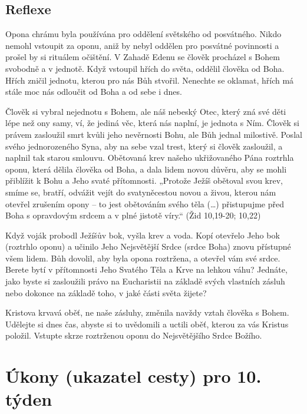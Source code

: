\documentclass[11pt]{article}
\begin{document}
\subsection*{Reflexe}
Opona chrámu byla používána pro oddělení světského od posvátného. Nikdo nemohl vstoupit za oponu, aniž by nebyl
oddělen pro posvátné povinnosti a prošel by si rituálem očištění. V Zahadě Edenu se člověk procházel s Bohem
svobodně a v jednotě. Když vstoupil hřích do světa, oddělil člověka od Boha. Hřích zničil jednotu, kterou pro nás Bůh
stvořil. Nenechte se oklamat, hřích má stále moc nás odloučit od Boha a od sebe i dnes.

Člověk si vybral nejednotu s Bohem, ale náš nebeský Otec, který zná své děti lépe než ony samy, ví, že jediná věc,
která nás naplní, je jednota s Ním. Člověk si právem zasloužil smrt kvůli jeho nevěrnosti Bohu, ale Bůh jednal
milostivě. Poslal svého jednorozeného Syna, aby na sebe vzal trest, který si člověk zasloužil, a naplnil tak starou
smlouvu. Obětovaná krev našeho ukřižovaného Pána roztrhla oponu, která dělila člověka od Boha, a dala lidem novou
důvěru, aby se mohli přiblížit k Bohu a Jeho svaté přítomnosti. „Protože Ježíš obětoval svou krev, smíme se, bratří,
odvážit vejít do svatyněcestou novou a živou, kterou nám otevřel zrušením opony – to jest obětováním svého těla (…)
přistupujme před Boha s opravdovým srdcem a v plné jistotě víry.“ (Žid 10,19-20; 10,22)

Když voják probodl Ježíšův bok, vyšla krev a voda. Kopí otevřelo Jeho bok (roztrhlo oponu) a učinilo Jeho Nejsvětější
Srdce (srdce Boha) znovu přístupné všem lidem. Bůh dovolil, aby byla opona roztržena, a otevřel vám své srdce.
Berete bytí v přítomnosti Jeho Svatého Těla a Krve na lehkou váhu? Jednáte, jako byste si zasloužili právo na
Eucharistii na základě svých vlastních zásluh nebo dokonce na základě toho, v jaké části světa žijete?

Kristova krvavá oběť, ne naše zásluhy, změnila navždy vztah člověka s Bohem. Udělejte si dnes čas, abyste si to
uvědomili a uctili oběť, kterou za vás Kristus položil. Vstupte skrze roztrženou oponu do Nejsvětějšího Srdce Božího.



\newpage
\section*{Úkony (ukazatel cesty) pro 10. týden}
\end{document}
